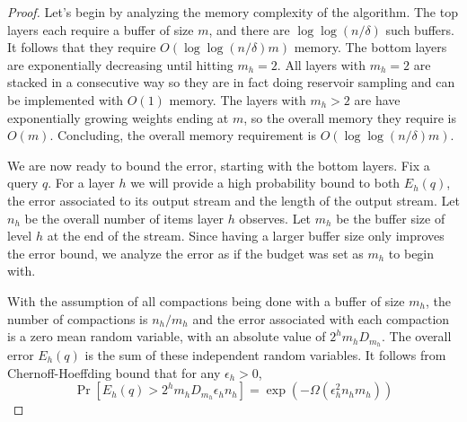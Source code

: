 \documentclass[anon,12pt]{colt2019} %
\newcommand{\eps}{\epsilon}
\renewcommand{\Pr}{\operatorname{Pr}}
\begin{document}
{\begin{proof}
Let's begin by analyzing the memory complexity of the algorithm. The top layers each require a buffer of size $m$, and there are $\log\log(n/\delta)$ such buffers. It follows that they require $O(\log\log(n/\delta)m)$ memory. The bottom layers are exponentially decreasing until hitting $m_h=2$. All layers with $m_h=2$ are stacked in a consecutive way so they are in fact doing reservoir sampling and can be implemented with $O(1)$ memory. The layers with $m_h>2$ are have exponentially growing weights ending at $m$, so the overall memory they require is $O(m)$. Concluding, the overall memory requirement is $O(\log\log(n/\delta)m)$.

We are now ready to bound the error, starting with the bottom layers. Fix a query $q$. For a layer $h$ we will provide a high probability bound to both $E_h(q)$, the error associated to its output stream and the length of the output stream. Let $n_h$ be the overall number of items layer $h$ observes. Let $m_h$ be the buffer size of level $h$ at the end of the stream. Since having a larger buffer size only improves the error bound, we analyze the error as if the budget was set as $m_h$ to begin with.

With the assumption of all compactions being done with a buffer of size $m_h$, the number of compactions is $n_h/m_h$ and the error associated with each compaction is a zero mean random variable, with an absolute value of $2^h m_h D_{m_h}$. The overall error $E_h(q)$ is the sum of these independent random variables. It follows from Chernoff-Hoeffding bound that for any $\eps_h > 0$,
\begin{equation} \label{eq:err low1}
\Pr\left[ E_h(q) > 2^h m_h D_{m_h} \eps_h n_h \right] = \exp \left( -\Omega\left( \eps_h^2 n_h m_h \right) \right)
\end{equation}


\end{proof}}
\end{document}

